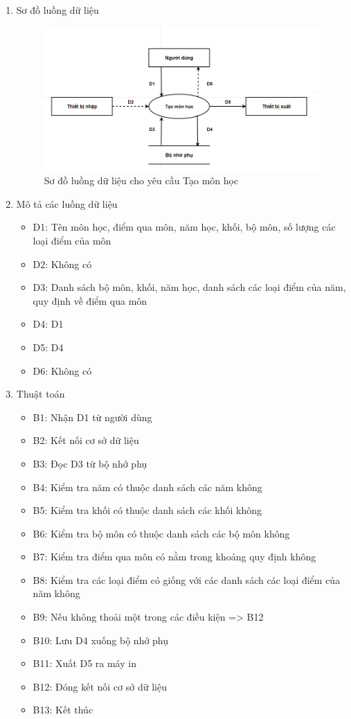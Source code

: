 \documentclass[a4paper]{article}
\begin{document}
\begin{enumerate}
\item Sơ đồ luồng dữ liệu
\begin{figure}[H] 
    \centering
    \includegraphics[width=1\textwidth]{dfd11} %
    \caption{Sơ đồ luồng dữ liệu cho yêu cầu Tạo môn học}
\end{figure}
\item Mô tả các luồng dữ liệu
\begin{itemize}
\item D1: Tên môn học, điểm qua môn, năm học, khối, bộ môn, số lượng các loại điểm của môn
\item D2: Không có
\item D3: Danh sách bộ môn, khối, năm học, danh sách các loại điểm của năm, quy định về điểm qua môn
\item D4: D1
\item D5: D4
\item D6: Không có
\end{itemize}
\item Thuật toán
\begin{itemize}
\item B1: Nhận D1 từ người dùng
\item B2: Kết nối cơ sở dữ liệu
\item B3: Đọc D3 từ bộ nhớ phụ
\item B4: Kiểm tra năm có thuộc danh sách các năm không
\item B5: Kiểm tra khối có thuộc danh sách các khối không
\item B6: Kiểm tra bộ môn có thuộc danh sách các bộ môn không
\item B7: Kiểm tra điểm qua môn có nằm trong khoảng quy định không
\item B8: Kiểm tra các loại điểm có giống với các danh sách các loại điểm của năm không
\item B9: Nếu không thoải một trong các điều kiện => B12
\item B10: Lưu D4 xuống bộ nhớ phụ
\item B11: Xuất D5 ra máy in
\item B12: Đóng kết nối cơ sở dữ liệu
\item B13: Kết thúc
\end{itemize}
\end{enumerate}	
							
\end{document}
